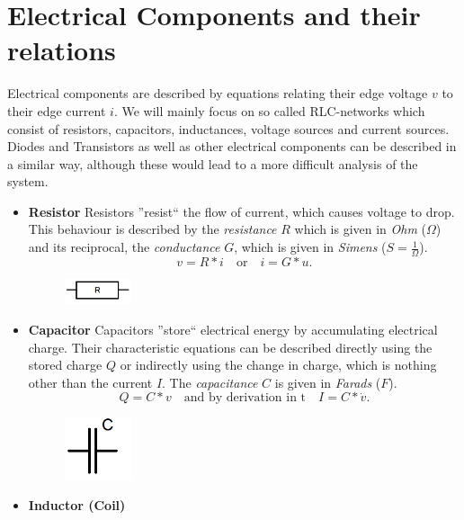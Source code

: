 \section{Electrical Components and their relations}
Electrical components are described by equations relating their edge voltage $v$ to their edge current $i$. We will mainly focus on so called RLC-networks which consist of resistors, capacitors, inductances, voltage sources and current sources. Diodes and Transistors as well as other electrical components can be described in a similar way, although these would lead to a more difficult analysis of the system.
\begin{itemize}
	\item \textbf{Resistor} \newline
	Resistors ''resist`` the flow of current, which causes voltage to drop. This behaviour is described by the \emph{resistance} $R$ which is given in \emph{Ohm} ($\Omega$) and its reciprocal, the \emph{conductance} $G$, which is given in \emph{Simens} ($S=\frac{1}{\Omega}$). 
	\begin{displaymath}
		v = R*i \quad \text{or} \quad i = G*u.
	\end{displaymath}
	\begin{figure}[H]
		\centering
		\includegraphics[width=2cm]{pictures/resistor.png}
	\end{figure}
	\item \textbf{Capacitor} \newline
	Capacitors ''store`` electrical energy by accumulating electrical charge. Their characteristic equations can be described directly using the stored charge $Q$ or indirectly using the change in charge, which is nothing other than the current $I$. The \emph{capacitance} $C$ is given in \emph{Farads} ($F$).
	\begin{displaymath}
		Q = C * v \quad \text{and by derivation in t} \quad I = C*\dot{v}.
	\end{displaymath}
	\begin{figure}[H]
		\centering
		\includegraphics[width=2cm]{pictures/capacitor.png}
	\end{figure}
	\item \textbf{Inductor (Coil)} \newline

\end{itemize}
